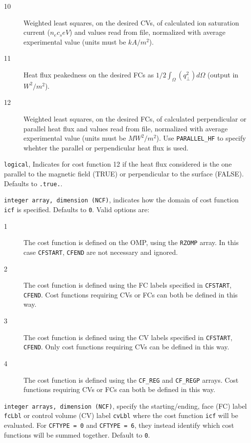 \begin{description}
\begin{description}
      \item[10] Weighted least squares, on the desired CVs, of calculated ion saturation current ($n_ec_seV$) and values read from file, normalized with average experimental value (units must be $kA/m^2$).
      \item[11] Heat flux peakedness on the desired FCs as $1/2\int_\Omega(q_\perp^2)d\Omega$ (output in $W^2/m^2$).
      \item[12] Weighted least squares, on the desired FCs, of calculated perpendicular or parallel heat flux and values read from file, normalized with average experimental value (units must be $MW^2/m^2$). Use {\tt PARALLEL\_HF} to specify whehter the parallel or perpendicular heat flux is used.
    \end{description}
  \item[PARALLEL\_HF] {\tt logical}, Indicates for cost function 12 if the heat flux considered is the one parallel to the magnetic field (TRUE) or perpendicular to the surface (FALSE). Defaults to {\tt .true.}.
  \item[CFDEF] {\tt integer array, dimension (NCF)}, indicates how the domain of cost function {\tt icf} is specified. Defaults to {\tt 0}. Valid options are:
    \begin{description}
      \item[1] The cost function is defined on the OMP, using the {\tt RZOMP} array. In this case {\tt CFSTART}, {\tt CFEND} are not necessary and ignored.
      \item[2] The cost function is defined using the FC labels specified in {\tt CFSTART}, {\tt CFEND}. Cost functions requiring CVs or FCs can both be defined in this way.
      \item[3] The cost function is defined using the CV labels specified in {\tt CFSTART}, {\tt CFEND}. Only cost functions requiring CVs can be defined in this way.
      \item[4] The cost function is defined using the {\tt CF\_REG} and {\tt CF\_REGP} arrays. Cost functions requiring CVs or FCs can both be defined in this way.
    \end{description}
  \item[CFSTART, CFEND] {\tt integer arrays, dimension (NCF)}, specify the starting/ending, face (FC) label {\tt fcLbl} or control volume (CV) label {\tt cvLbl} where the cost function {\tt icf} will be evaluated. For {\tt CFTYPE = 0} and {\tt CFTYPE = 6}, they instead identify which cost functions will be summed together. Default to {\tt 0}.

\end{description}

